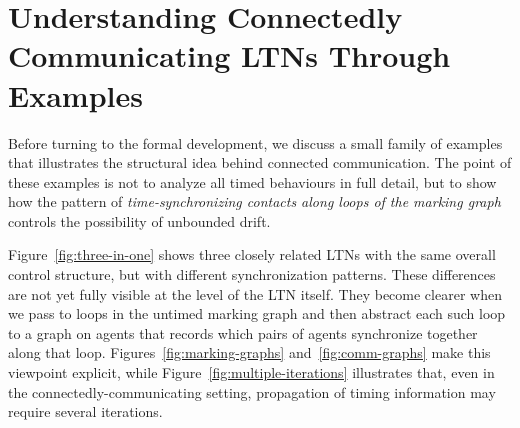 
\section{Understanding Connectedly Communicating LTNs Through Examples}
\label{sec:prelims}

Before turning to the formal development, we discuss a small family of examples
that illustrates the structural idea behind connected communication. The point of
these examples is not to analyze all timed behaviours in full detail, but to show
how the pattern of \emph{time-synchronizing contacts along loops of the marking graph}
controls the possibility of unbounded drift.

Figure~\ref{fig:three-in-one} shows three closely related LTNs with the same
overall control structure, but with different synchronization patterns. These
differences are not yet fully visible at the level of the LTN itself. They become
clearer when we pass to loops in the untimed marking graph and then abstract each
such loop to a graph on agents that records which pairs of agents synchronize
together along that loop. Figures~\ref{fig:marking-graphs}
and~\ref{fig:comm-graphs} make this viewpoint explicit, while
Figure~\ref{fig:multiple-iterations} illustrates that, even in the
connectedly-communicating setting, propagation of timing information may require
several iterations.

